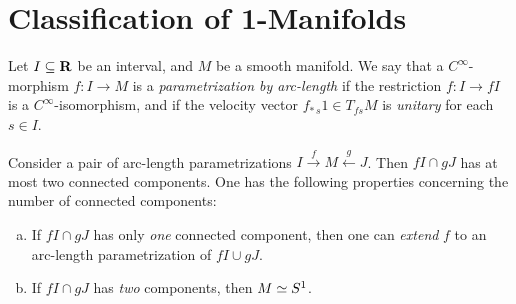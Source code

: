 \section{Classification of 1-Manifolds}

\begin{definition}
\label{def:parametrization-by-arc-length}
Let \(I \subseteq \mathbf{R}\) be an interval, and \(M\) be a smooth manifold. We say that a
\(C^{\infty}\)-morphism \(f: I \to M\) is a \emph{parametrization by arc-length} if the
restriction \(f: I \to f I\) is a \(C^{\infty}\)-isomorphism, and if the velocity
vector \(f_{*\, s} 1 \in T_{f s} M\) is \emph{unitary} for each \(s \in I\).
\end{definition}

\begin{lemma}
\label{lem:image-components-arc-len-parametrization}
Consider a pair of arc-length parametrizations
\(I \xrightarrow f M \xleftarrow g J\). Then \(f I \cap g J\) has at most two
connected components. One has the following properties concerning the number of
connected components:
\begin{enumerate}[(a)]\setlength\itemsep{0em}
\item If \(f I \cap g J\) has only \emph{one} connected component, then one can
  \emph{extend} \(f\) to an arc-length parametrization of \(f I \cup g J\).
\item If \(f I \cap g J\) has \emph{two} components, then \(M \simeq S^1\).
\end{enumerate}
\end{lemma}

